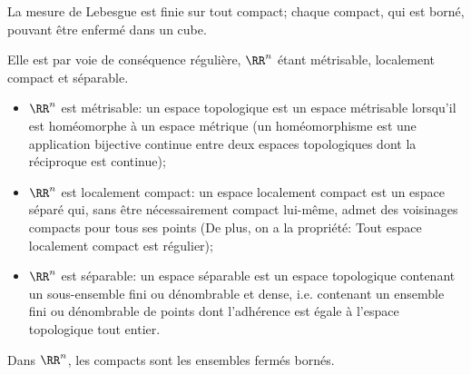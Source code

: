 \begin{theoreme}
La mesure de Lebesgue est finie sur tout compact; chaque compact, qui est borné,
pouvant être enfermé dans un cube.
\end{theoreme}

Elle est par voie de conséquence régulière, $\RR^n$ étant métrisable, localement compact et séparable.
\begin{itemize}
   \item $\RR^n$ est métrisable: un espace topologique est un espace métrisable lorsqu'il est
	homéomorphe à un espace métrique (un homéomorphisme est une application bijective
	continue entre deux espaces topologiques dont la réciproque est continue);
   \item $\RR^n$ est localement compact: un espace localement compact est un espace séparé qui,
	sans être nécessairement compact lui-même, admet des voisinages compacts pour tous
	ses points (De plus, on a la propriété: Tout espace localement compact est régulier);
   \item $\RR^n$ est séparable: un espace séparable est un espace topologique contenant un
	sous-ensemble fini ou dénombrable et dense, i.e. contenant un ensemble fini ou dénombrable
	de points dont l'adhérence est égale à l'espace topologique tout entier.
\end{itemize}

\begin{theoreme}
Dans $\RR^n$, les compacts sont les ensembles fermés bornés.
\end{theoreme}


